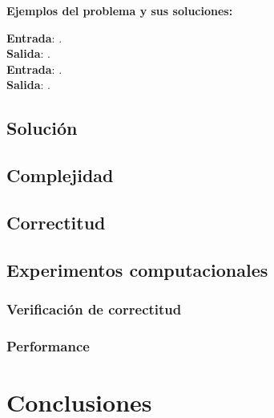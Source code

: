 \documentclass[a4paper, 10pt, twoside]{article}
\begin{document}
\textbf{Ejemplos del problema y sus soluciones:}

\textbf{Entrada}: . \\
\textbf{Salida}: . \\

\textbf{Entrada}: . \\
\textbf{Salida}: . \\

\subsection{Solución}

\subsection{Complejidad}

\subsection{Correctitud}

\subsection{Experimentos computacionales}
\subsubsection{Verificación de correctitud}

\subsubsection{Performance}





\newpage

\section{Conclusiones}




\end{document}
